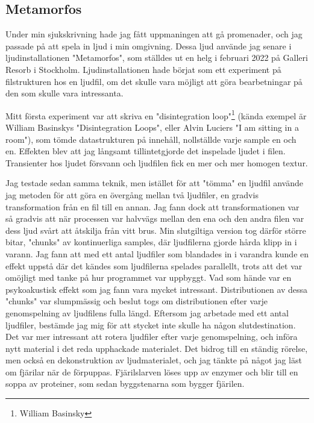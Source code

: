 \documentclass{article}
\begin{document}
  \subsection{Metamorfos}
  Under min sjukskrivning hade jag fått uppmaningen att gå promenader, och jag passade på att spela in ljud i
  min omgivning. Dessa ljud använde jag senare i ljudinstallationen "Metamorfos", som ställdes ut en helg i
  februari 2022 på Galleri Resorb i Stockholm. Ljudinstallationen hade börjat som ett experiment på
  filstrukturen hos en ljudfil, om det skulle vara möjligt att göra bearbetningar på den som skulle vara
  intressanta. 

  Mitt första experiment var att skriva en "disintegration loop"\footnote{William Basinsky} (kända
  exempel är William Basinskys "Disintegration Loops", eller Alvin Luciers "I am sitting in a room"), som
  tömde datastrukturen på innehåll, nollställde varje sample en och en. Effekten blev att jag långsamt
  tillintetgjorde det inspelade ljudet i filen. Transienter hos ljudet försvann och ljudfilen fick en mer och
  mer homogen textur.

  Jag testade sedan samma teknik, men istället för att "tömma" en ljudfil använde jag metoden för att göra en
  övergång mellan två ljudfiler, en gradvis transformation från en fil till en annan. Jag fann dock att
  transformationen var så gradvis att när processen var halvvägs mellan den ena och den andra filen var dess
  ljud svårt att åtskilja från vitt brus. Min slutgiltiga version tog därför större bitar, "chunks" av
  kontinuerliga samples, där ljudfilerna gjorde hårda klipp in i varann. Jag fann att med ett antal ljudfiler
  som blandades in i varandra kunde en effekt uppstå där det kändes som ljudfilerna spelades parallellt, trots
  att det var omöjligt med tanke på hur programmet var uppbyggt. Vad som hände var en psykoakustisk effekt som
  jag fann vara mycket intressant. Distributionen av dessa "chunks" var slumpmässig och beslut togs om
  distributionen efter varje genomspelning av ljudfilens fulla längd. Eftersom jag arbetade med ett antal
  ljudfiler, bestämde jag mig för att stycket inte skulle ha någon slutdestination. Det var mer intressant att
  rotera ljudfiler efter varje genomspelning, och införa nytt material i det reda upphackade materialet. Det
  bidrog till en ständig rörelse, men också en dekonstruktion av ljudmaterialet, och jag tänkte på något jag
  läst om fjärilar när de förpuppas. Fjärilslarven löses upp av enzymer och blir till en soppa av proteiner,
  som sedan byggstenarna som bygger fjärilen.
\end{document}

